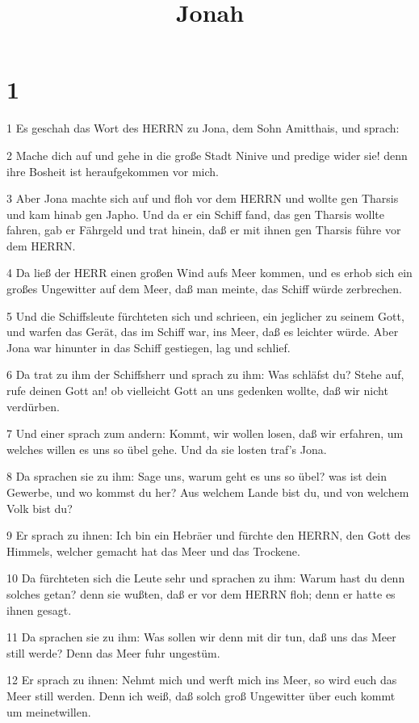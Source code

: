 

\title{Jonah}


\chapter{1}

\par 1 Es geschah das Wort des HERRN zu Jona, dem Sohn Amitthais, und sprach:
\par 2 Mache dich auf und gehe in die große Stadt Ninive und predige wider sie! denn ihre Bosheit ist heraufgekommen vor mich.
\par 3 Aber Jona machte sich auf und floh vor dem HERRN und wollte gen Tharsis und kam hinab gen Japho. Und da er ein Schiff fand, das gen Tharsis wollte fahren, gab er Fährgeld und trat hinein, daß er mit ihnen gen Tharsis führe vor dem HERRN.
\par 4 Da ließ der HERR einen großen Wind aufs Meer kommen, und es erhob sich ein großes Ungewitter auf dem Meer, daß man meinte, das Schiff würde zerbrechen.
\par 5 Und die Schiffsleute fürchteten sich und schrieen, ein jeglicher zu seinem Gott, und warfen das Gerät, das im Schiff war, ins Meer, daß es leichter würde. Aber Jona war hinunter in das Schiff gestiegen, lag und schlief.
\par 6 Da trat zu ihm der Schiffsherr und sprach zu ihm: Was schläfst du? Stehe auf, rufe deinen Gott an! ob vielleicht Gott an uns gedenken wollte, daß wir nicht verdürben.
\par 7 Und einer sprach zum andern: Kommt, wir wollen losen, daß wir erfahren, um welches willen es uns so übel gehe. Und da sie losten traf's Jona.
\par 8 Da sprachen sie zu ihm: Sage uns, warum geht es uns so übel? was ist dein Gewerbe, und wo kommst du her? Aus welchem Lande bist du, und von welchem Volk bist du?
\par 9 Er sprach zu ihnen: Ich bin ein Hebräer und fürchte den HERRN, den Gott des Himmels, welcher gemacht hat das Meer und das Trockene.
\par 10 Da fürchteten sich die Leute sehr und sprachen zu ihm: Warum hast du denn solches getan? denn sie wußten, daß er vor dem HERRN floh; denn er hatte es ihnen gesagt.
\par 11 Da sprachen sie zu ihm: Was sollen wir denn mit dir tun, daß uns das Meer still werde? Denn das Meer fuhr ungestüm.
\par 12 Er sprach zu ihnen: Nehmt mich und werft mich ins Meer, so wird euch das Meer still werden. Denn ich weiß, daß solch groß Ungewitter über euch kommt um meinetwillen.
